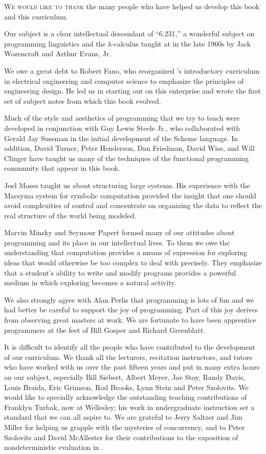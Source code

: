 \label{Acknowledgments}

\lettrine[findent=1pt]{W}{e would like to thank} the many people who have helped us develop this book and this curriculum.

Our subject is a clear intellectual descendant of “6.231,” a wonderful subject on programming linguistics and the λ-calculus taught at  in the late 1960s by Jack Wozencraft and Arthur Evans, Jr.

We owe a great debt to Robert Fano, who reorganized ’s introductory curriculum in electrical engineering and computer science to emphasize the principles of engineering design.
He led us in starting out on this enterprise and wrote the first set of subject notes from which this book evolved.

Much of the style and aesthetics of programming that we try to teach were developed in conjunction with Guy Lewis Steele Jr., who collaborated with Gerald Jay Sussman in the initial development of the Scheme language.
In addition, David Turner, Peter Henderson, Dan Friedman, David Wise, and Will Clinger have taught us many of the techniques of the functional programming community that appear in this book.

Joel Moses taught us about structuring large systems.
His experience with the Macsyma system for symbolic computation provided the insight that one should avoid complexities of control and concentrate on organizing the data to reflect the real structure of the world being modeled.

Marvin Minsky and Seymour Papert formed many of our attitudes about programming and its place in our intellectual lives.
To them we owe the understanding that computation provides a means of expression for exploring ideas that would otherwise be too complex to deal with precisely.
They emphasize that a student’s ability to write and modify programs provides a powerful medium in which exploring becomes a natural activity.

We also strongly agree with Alan Perlis that programming is lots of fun and we had better be careful to support the joy of programming.
Part of this joy derives from observing great masters at work.
We are fortunate to have been apprentice programmers at the feet of Bill Gosper and Richard Greenblatt.

It is difficult to identify all the people who have contributed to the development of our curriculum.
We thank all the lecturers, recitation instructors, and tutors who have worked with us over the past fifteen years and put in many extra hours on our subject, especially Bill Siebert, Albert Meyer, Joe Stoy, Randy Davis, Louis Braida, Eric Grimson, Rod Brooks, Lynn Stein and Peter Szolovits.
We would like to specially acknowledge the outstanding teaching contributions of Franklyn Turbak, now at Wellesley;
his work in undergraduate instruction set a standard that we can all aspire to.
We are grateful to Jerry Saltzer and Jim Miller for helping us grapple with the mysteries of concurrency, and to Peter Szolovits and David McAllester for their contributions to the exposition of nondeterministic evaluation in .

